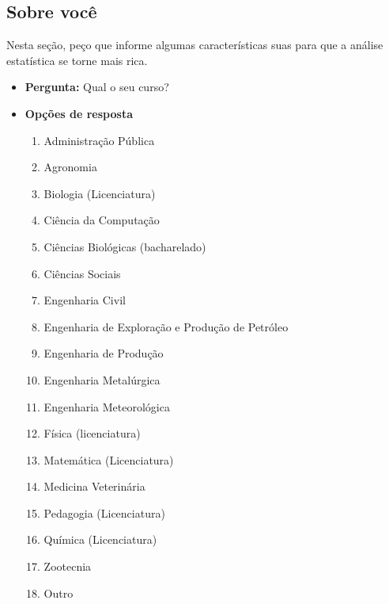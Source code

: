 \begin{apendicesenv}
  \section*{Sobre você}

  Nesta seção, peço que informe algumas características suas para que a análise estatística se torne mais rica.

  \begin{itemize}
    \item \textbf{Pergunta:} Qual o seu curso?
    \item \textbf{Opções de resposta}
          \begin{enumerate}
            \item Administração Pública
            \item Agronomia
            \item Biologia (Licenciatura)
            \item Ciência da Computação
            \item Ciências Biológicas (bacharelado)
            \item Ciências Sociais
            \item Engenharia Civil
            \item Engenharia de Exploração e Produção de Petróleo
            \item Engenharia de Produção
            \item Engenharia Metalúrgica
            \item Engenharia Meteorológica
            \item Física (licenciatura)
            \item Matemática (Licenciatura)
            \item Medicina Veterinária
            \item Pedagogia (Licenciatura)
            \item Química (Licenciatura)
            \item Zootecnia
            \item Outro
          \end{enumerate}
  \end{itemize}


\end{apendicesenv}
